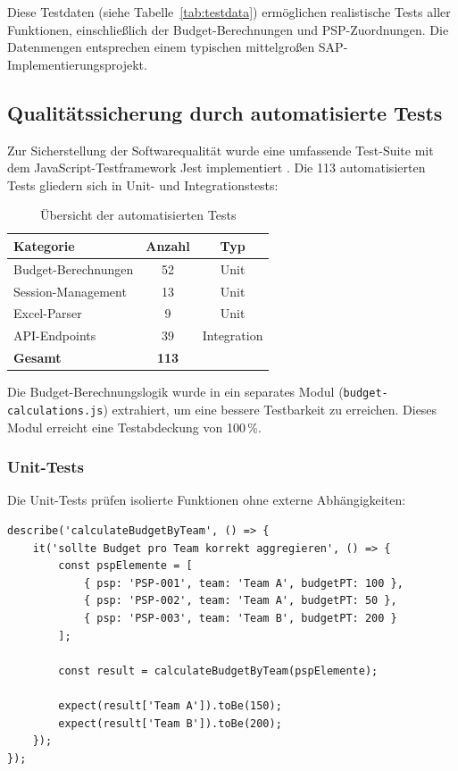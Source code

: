 Diese Testdaten (siehe Tabelle~\ref{tab:testdata}) ermöglichen realistische Tests aller Funktionen, einschließlich der Budget-Berechnungen und PSP-Zuordnungen. Die Datenmengen entsprechen einem typischen mittelgroßen SAP-Implementierungsprojekt.

\subsection{Qualitätssicherung durch automatisierte Tests}

Zur Sicherstellung der Softwarequalität wurde eine umfassende Test-Suite mit dem JavaScript-Testframework Jest implementiert \citep{jest2024}. Die 113 automatisierten Tests gliedern sich in Unit- und Integrationstests:

\begin{table}[H]
\centering
\caption{Übersicht der automatisierten Tests}
\label{tab:tests}
\begin{tabularx}{\textwidth}{Xcc}
\toprule
\textbf{Kategorie} & \textbf{Anzahl} & \textbf{Typ} \\
\midrule
Budget-Berechnungen & 52 & Unit \\
Session-Management & 13 & Unit \\
Excel-Parser & 9 & Unit \\
API-Endpoints & 39 & Integration \\
\midrule
\textbf{Gesamt} & \textbf{113} & \\
\bottomrule
\end{tabularx}
\end{table}

Die Budget-Berechnungslogik wurde in ein separates Modul (\texttt{budget-calculations.js}) extrahiert, um eine bessere Testbarkeit zu erreichen. Dieses Modul erreicht eine Testabdeckung von 100\,\%.

\subsubsection{Unit-Tests}

Die Unit-Tests prüfen isolierte Funktionen ohne externe Abhängigkeiten:

\begin{lstlisting}[caption={Beispiel Unit-Test für Budget-Berechnung}, label={lst:unit-test}]
describe('calculateBudgetByTeam', () => {
    it('sollte Budget pro Team korrekt aggregieren', () => {
        const pspElemente = [
            { psp: 'PSP-001', team: 'Team A', budgetPT: 100 },
            { psp: 'PSP-002', team: 'Team A', budgetPT: 50 },
            { psp: 'PSP-003', team: 'Team B', budgetPT: 200 }
        ];

        const result = calculateBudgetByTeam(pspElemente);

        expect(result['Team A']).toBe(150);
        expect(result['Team B']).toBe(200);
    });
});
\end{lstlisting}

